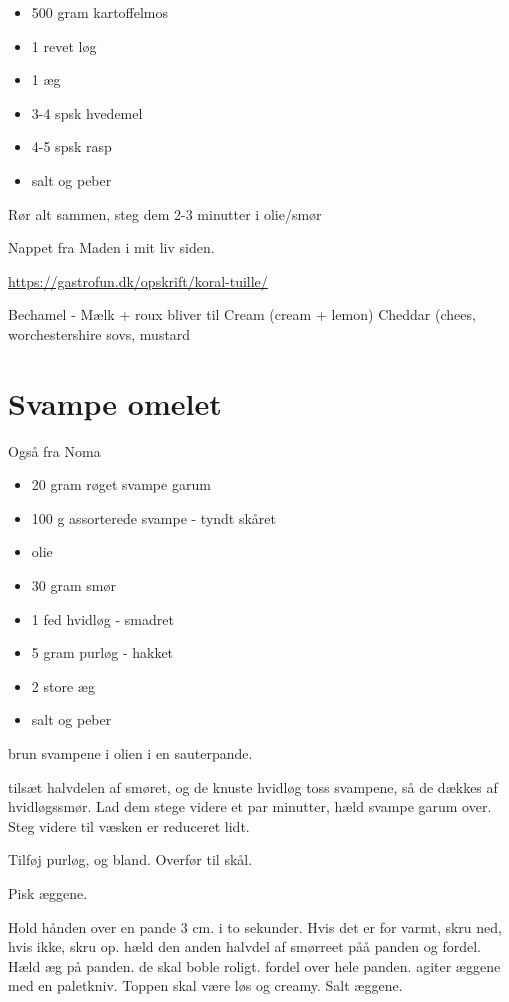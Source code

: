 \documentclass[
]{book}
\providecommand{\tightlist}{%
  \setlength{\itemsep}{0pt}\setlength{\parskip}{0pt}}
\begin{document}
\begin{itemize}
\tightlist
\item
  500 gram kartoffelmos
\item
  1 revet løg
\item
  1 æg
\item
  3-4 spsk hvedemel
\item
  4-5 spsk rasp
\item
  salt og peber
\end{itemize}

Rør alt sammen, steg dem 2-3 minutter i olie/smør

Nappet fra Maden i mit liv siden.

\url{https://gastrofun.dk/opskrift/koral-tuille/}

Bechamel - Mælk + roux
bliver til
Cream (cream + lemon)
Cheddar (chees, worchestershire sovs, mustard

\section{Svampe omelet}\label{svampe-omelet}

Også fra Noma

\begin{itemize}
\tightlist
\item
  20 gram røget svampe garum
\item
  100 g assorterede svampe - tyndt skåret
\item
  olie
\item
  30 gram smør
\item
  1 fed hvidløg - smadret
\item
  5 gram purløg - hakket
\item
  2 store æg
\item
  salt og peber
\end{itemize}

brun svampene i olien i en sauterpande.

tilsæt halvdelen af smøret, og de knuste hvidløg
toss svampene, så de dækkes af hvidløgssmør.
Lad dem stege videre et par minutter, hæld svampe garum over. Steg videre til væsken er reduceret lidt.

Tilføj purløg, og bland. Overfør til skål.

Pisk æggene.

Hold hånden over en pande 3 cm. i to sekunder. Hvis det er for varmt, skru ned, hvis ikke, skru op.
hæld den anden halvdel af smørreet påå panden og fordel.
Hæld æg på panden. de skal boble roligt. fordel over hele panden. agiter æggene med en paletkniv.
Toppen skal være løs og creamy. Salt æggene.
\end{document}
